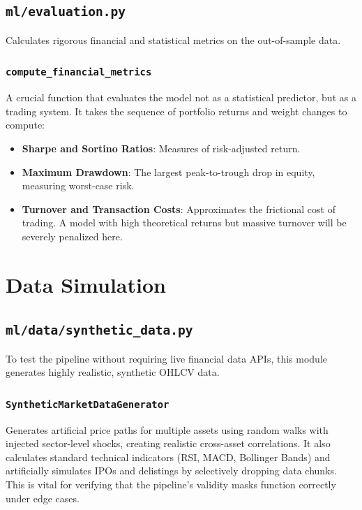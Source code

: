 \documentclass[12pt,a4paper]{report}
\begin{document}
\section{\texttt{ml/evaluation.py}}
Calculates rigorous financial and statistical metrics on the out-of-sample data.

\subsection{\texttt{compute\_financial\_metrics}}
A crucial function that evaluates the model not as a statistical predictor, but as a trading system. It takes the sequence of portfolio returns and weight changes to compute:
\begin{itemize}
    \item \textbf{Sharpe and Sortino Ratios}: Measures of risk-adjusted return.
    \item \textbf{Maximum Drawdown}: The largest peak-to-trough drop in equity, measuring worst-case risk.
    \item \textbf{Turnover and Transaction Costs}: Approximates the frictional cost of trading. A model with high theoretical returns but massive turnover will be severely penalized here.
\end{itemize}

\chapter{Data Simulation}

\section{\texttt{ml/data/synthetic\_data.py}}
To test the pipeline without requiring live financial data APIs, this module generates highly realistic, synthetic OHLCV data.

\subsection{\texttt{SyntheticMarketDataGenerator}}
Generates artificial price paths for multiple assets using random walks with injected sector-level shocks, creating realistic cross-asset correlations. It also calculates standard technical indicators (RSI, MACD, Bollinger Bands) and artificially simulates IPOs and delistings by selectively dropping data chunks. This is vital for verifying that the pipeline's validity masks function correctly under edge cases.
\end{document}
